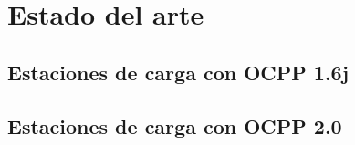 \chapter{Estado del arte}

\section{Estaciones de carga con OCPP 1.6j}

\section{Estaciones de carga con OCPP 2.0}
\cleardoublepage